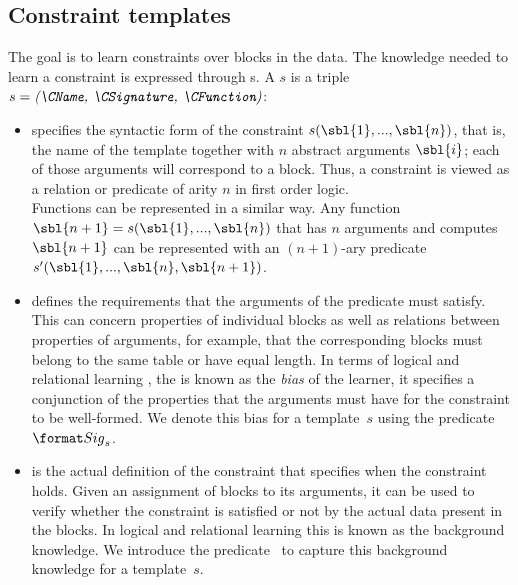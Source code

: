 \subsection{Constraint templates}
The goal is to learn constraints over blocks in the data. The knowledge needed to learn a constraint is expressed through {\template}s.
%
A \template $s$ is a triple $s = \textit{(\CName, \CSignature, \CFunction)}$:
\begin{itemize}
\item
\textit{\CName}  specifies the syntactic form of the constraint $s(\sbl{1}, ...,\sbl{n})$, that is, the name of the template together
with $n$ abstract arguments $\sbl{i}$; each of those arguments will correspond to a block.
Thus, a constraint is viewed as a relation or predicate of arity $n$ in first order logic.\\
Functions can be represented in a similar way. Any function $\sbl{n+1}=s(\sbl{1},...,\sbl{n})$ that has $n$ arguments and computes $\sbl{n+1}$ can be represented with an $(n{+}1)$-ary predicate $s'(\sbl{1},...,\sbl{n},\sbl{n+1})$.

\item \textit{\CSignature} defines the requirements that the arguments of the predicate must satisfy.
This can concern properties of individual blocks as well as relations between properties of arguments, for example, that the corresponding blocks must belong to the same table or have equal length.
In terms of logical and relational learning \parencite{luc_book}, the \CSignature is known as the {\em bias} of the learner, it specifies a conjunction of the properties that the arguments must have for the constraint to be well-formed.
We denote this bias for a template~$s$ using the predicate $\sigc$.
\item \textit{\CFunction} is the actual definition of the constraint that specifies when the constraint holds.
Given an assignment of blocks to its arguments, it can be used to verify whether the constraint is satisfied or not by the actual data present in the blocks. %
In logical and relational learning this is known as the background knowledge.
We introduce the predicate ~to capture this background knowledge for a template~$s$.
\end{itemize}

